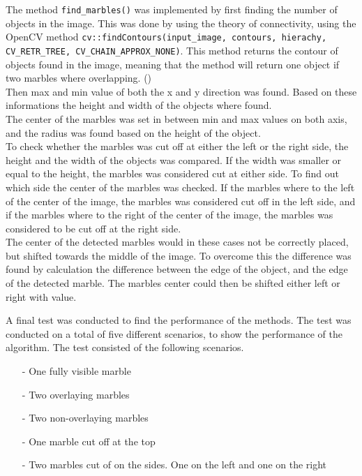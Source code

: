\documentclass[../Head/Main.tex]{subfiles}
\begin{document}
The method \texttt{find\_marbles()} was implemented by first finding the number of objects in the image. This was done by using the theory of connectivity, using the OpenCV method \texttt{cv::findContours(input\_image, contours, hierachy, CV\_RETR\_TREE, CV\_CHAIN\_APPROX\_NONE)}. This method returns the contour of objects found in the image, meaning that the method will return one object if two marbles where overlapping. (\cite[p. 66-70]{OCV})\\
Then max and min value of both the x and y direction was found. Based on these informations the height and width of the objects where found.\\
The center of the marbles was set in between min and max values on both axis, and the radius was found based on the height of the object.\\
To check whether the marbles was cut off at either the left or the right side, the height and the width of the objects was compared. If the width was smaller or equal to the height, the marbles was considered cut at either side. To find out which side the center of the marbles was checked. If the marbles where to the left of the center of the image, the marbles was considered cut off in the left side, and if the marbles where to the right of the center of the image, the marbles was considered to be cut off at the right side.\\
The center of the detected marbles would in these cases not be correctly placed, but shifted towards the middle of the image. To overcome this the difference was found by calculation the difference between the edge of the object, and the edge of the detected marble. The marbles center could then be shifted either left or right with value.\par 
A final test was conducted to find the performance of the methods. The test was conducted on a total of five different scenarios, to show the performance of the algorithm. The test consisted of the following scenarios.
\begin{itemize} \vspace{-5pt}
	\item[-] One fully visible marble \vspace{-7pt}
	\item[-] Two overlaying marbles \vspace{-7pt}
	\item[-] Two non-overlaying marbles \vspace{-7pt}
	\item[-] One marble cut off at the top \vspace{-7pt}
	\item[-] Two marbles cut of on the sides. One on the left and one on the right
\end{itemize} \vspace{-5pt}
\end{document}
